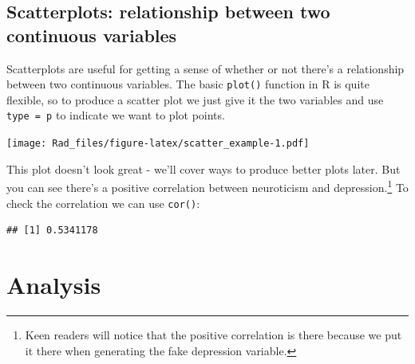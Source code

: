 \documentclass[
]{book}
\newenvironment{Shaded}{\begin{snugshade}}{\end{snugshade}}
\newcommand{\AttributeTok}[1]{\textcolor[rgb]{0.77,0.63,0.00}{#1}}
\newcommand{\FunctionTok}[1]{\textcolor[rgb]{0.00,0.00,0.00}{#1}}
\newcommand{\NormalTok}[1]{#1}
\newcommand{\SpecialCharTok}[1]{\textcolor[rgb]{0.00,0.00,0.00}{#1}}
\newcommand{\StringTok}[1]{\textcolor[rgb]{0.31,0.60,0.02}{#1}}
\begin{document}
\hypertarget{scatterplots-relationship-between-two-continuous-variables}{%
\subsection{Scatterplots: relationship between two continuous variables}\label{scatterplots-relationship-between-two-continuous-variables}}

Scatterplots are useful for getting a sense of whether or
not there's a relationship between two continuous variables.
The basic \texttt{plot()} function in R is quite flexible, so to
produce a scatter plot we just give it the two variables
and use \texttt{type\ =\ \textquotesingle{}p\textquotesingle{}} to indicate we want to plot points.

\begin{Shaded}
\end{Shaded}

\texttt{[image: Rad\_files/figure-latex/scatter\_example-1.pdf]}

This plot doesn't look great - we'll cover ways to produce
better plots later. But you can see there's a positive
correlation between neuroticism and depression.\footnote{Keen readers will notice that the positive correlation is
  there because we put it there when generating the fake depression
  variable.}
To check the correlation we can use \texttt{cor()}:

\begin{Shaded}
\end{Shaded}

\begin{verbatim}
## [1] 0.5341178
\end{verbatim}

\hypertarget{analysis}{%
\section{Analysis}\label{analysis}}
\end{document}
